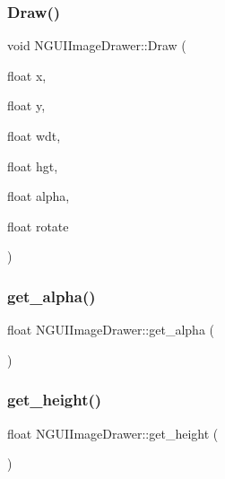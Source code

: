 \hypertarget{class_n_g_u_i_image_drawer_af9fd91d6b60106153fc4d637f68d1b5f}{}\label{class_n_g_u_i_image_drawer_af9fd91d6b60106153fc4d637f68d1b5f} 
\subsubsection{\texorpdfstring{Draw()}{Draw()}\hspace{0.1cm}{\footnotesize\ttfamily [2/2]}}
{\footnotesize\ttfamily void N\+G\+U\+I\+Image\+Drawer\+::\+Draw (\begin{DoxyParamCaption}\item[{float}]{x,  }\item[{float}]{y,  }\item[{float}]{wdt,  }\item[{float}]{hgt,  }\item[{float}]{alpha,  }\item[{float}]{rotate }\end{DoxyParamCaption})}

\hypertarget{class_n_g_u_i_image_drawer_a34d6e8daff23a22f8653696ed9a8d362}{}\label{class_n_g_u_i_image_drawer_a34d6e8daff23a22f8653696ed9a8d362} 
\subsubsection{\texorpdfstring{get\+\_\+alpha()}{get\_alpha()}}
{\footnotesize\ttfamily float N\+G\+U\+I\+Image\+Drawer\+::get\+\_\+alpha (\begin{DoxyParamCaption}{ }\end{DoxyParamCaption})}

\hypertarget{class_n_g_u_i_image_drawer_ae3a0c51715711b33c0327ae1cfea3a13}{}\label{class_n_g_u_i_image_drawer_ae3a0c51715711b33c0327ae1cfea3a13} 
\subsubsection{\texorpdfstring{get\+\_\+height()}{get\_height()}}
{\footnotesize\ttfamily float N\+G\+U\+I\+Image\+Drawer\+::get\+\_\+height (\begin{DoxyParamCaption}{ }\end{DoxyParamCaption})}

